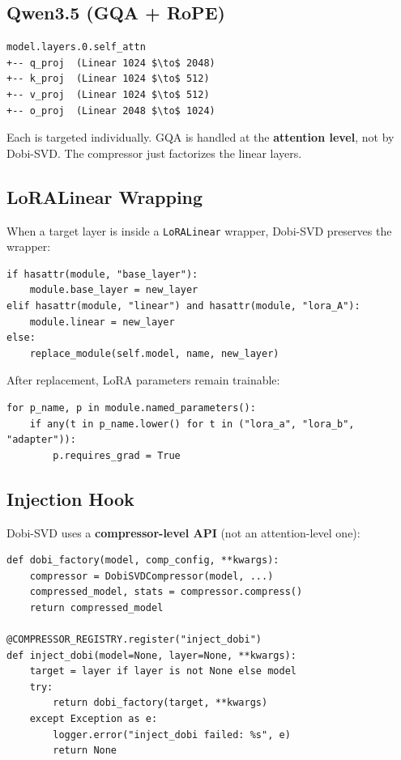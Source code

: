 \subsection{Qwen3.5 (GQA + RoPE)}

\begin{lstlisting}
model.layers.0.self_attn
+-- q_proj  (Linear 1024 $\to$ 2048)
+-- k_proj  (Linear 1024 $\to$ 512)
+-- v_proj  (Linear 1024 $\to$ 512)
+-- o_proj  (Linear 2048 $\to$ 1024)
\end{lstlisting}

Each is targeted individually. GQA is handled at the \textbf{attention level}, 
not by Dobi-SVD. The compressor just factorizes the linear layers.

\subsection{LoRALinear Wrapping}

When a target layer is inside a \texttt{LoRALinear} wrapper, Dobi-SVD preserves 
the wrapper:

\begin{lstlisting}
if hasattr(module, "base_layer"):
    module.base_layer = new_layer
elif hasattr(module, "linear") and hasattr(module, "lora_A"):
    module.linear = new_layer
else:
    replace_module(self.model, name, new_layer)
\end{lstlisting}

After replacement, LoRA parameters remain trainable:

\begin{lstlisting}
for p_name, p in module.named_parameters():
    if any(t in p_name.lower() for t in ("lora_a", "lora_b", "adapter")):
        p.requires_grad = True
\end{lstlisting}

\subsection{Injection Hook}

Dobi-SVD uses a \textbf{compressor-level API} (not an attention-level one):

\begin{lstlisting}
def dobi_factory(model, comp_config, **kwargs):
    compressor = DobiSVDCompressor(model, ...)
    compressed_model, stats = compressor.compress()
    return compressed_model

@COMPRESSOR_REGISTRY.register("inject_dobi")
def inject_dobi(model=None, layer=None, **kwargs):
    target = layer if layer is not None else model
    try:
        return dobi_factory(target, **kwargs)
    except Exception as e:
        logger.error("inject_dobi failed: %s", e)
        return None
\end{lstlisting}

